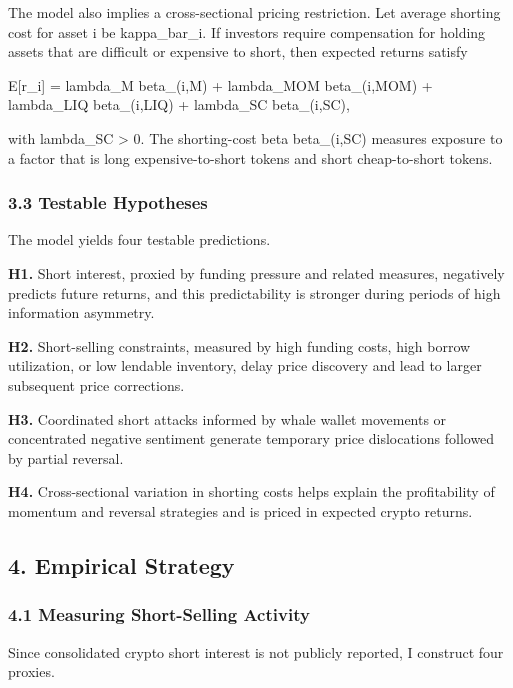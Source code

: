 \documentclass[
]{article}
\begin{document}
The model also implies a cross-sectional pricing restriction. Let
average shorting cost for asset i be kappa\_bar\_i. If investors require
compensation for holding assets that are difficult or expensive to
short, then expected returns satisfy

E{[}r\_i{]} = lambda\_M beta\_(i,M) + lambda\_MOM beta\_(i,MOM) +
lambda\_LIQ beta\_(i,LIQ) + lambda\_SC beta\_(i,SC),

with lambda\_SC \textgreater{} 0. The shorting-cost beta beta\_(i,SC)
measures exposure to a factor that is long expensive-to-short tokens and
short cheap-to-short tokens.

\subsubsection{3.3 Testable Hypotheses}\label{33-testable-hypotheses}

The model yields four testable predictions.

\textbf{H1.} Short interest, proxied by funding pressure and related
measures, negatively predicts future returns, and this predictability is
stronger during periods of high information asymmetry.

\textbf{H2.} Short-selling constraints, measured by high funding costs,
high borrow utilization, or low lendable inventory, delay price
discovery and lead to larger subsequent price corrections.

\textbf{H3.} Coordinated short attacks informed by whale wallet
movements or concentrated negative sentiment generate temporary price
dislocations followed by partial reversal.

\textbf{H4.} Cross-sectional variation in shorting costs helps explain
the profitability of momentum and reversal strategies and is priced in
expected crypto returns.

\subsection{4. Empirical Strategy}\label{4-empirical-strategy}

\subsubsection{4.1 Measuring Short-Selling
Activity}\label{41-measuring-short-selling-activity}

Since consolidated crypto short interest is not publicly reported, I
construct four proxies.
\end{document}
